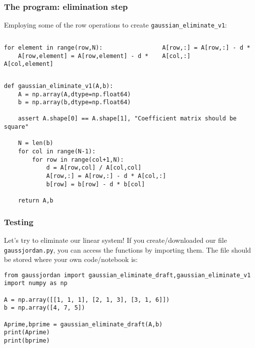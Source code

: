 \begin{frame}[fragile]
  \frametitle{The program: elimination step}
  Employing some of the row operations to create \lstinline|gaussian_eliminate_v1|:
  \begin{columns}[T]
    \begin{lstlisting}
for element in range(row,N):
    A[row,element] = A[row,element] - d * A[col,element]
        \end{lstlisting}    
    \begin{lstlisting}
A[row,:] = A[row,:] - d * A[col,:]
        \end{lstlisting}
  \end{columns}
  \pause
  \begin{lstlisting}
def gaussian_eliminate_v1(A,b):
    A = np.array(A,dtype=np.float64)
    b = np.array(b,dtype=np.float64)

    assert A.shape[0] == A.shape[1], "Coefficient matrix should be square"

    N = len(b)
    for col in range(N-1):
        for row in range(col+1,N):
            d = A[row,col] / A[col,col]
            A[row,:] = A[row,:] - d * A[col,:]
            b[row] = b[row] - d * b[col]

    return A,b
  \end{lstlisting}
\end{frame}

\begin{frame}[fragile]
  \frametitle{Testing}
  Let's try to eliminate our linear system! If you create/downloaded our file \lstinline|gaussjordan.py|, you can access the functions by importing them. The file should be stored where your own code/notebook is:
  \begin{lstlisting}
from gaussjordan import gaussian_eliminate_draft,gaussian_eliminate_v1
import numpy as np

A = np.array([[1, 1, 1], [2, 1, 3], [3, 1, 6]]) 
b = np.array([4, 7, 5]) 

Aprime,bprime = gaussian_eliminate_draft(A,b)
print(Aprime)
print(bprime)
  \end{lstlisting}
\end{frame}

